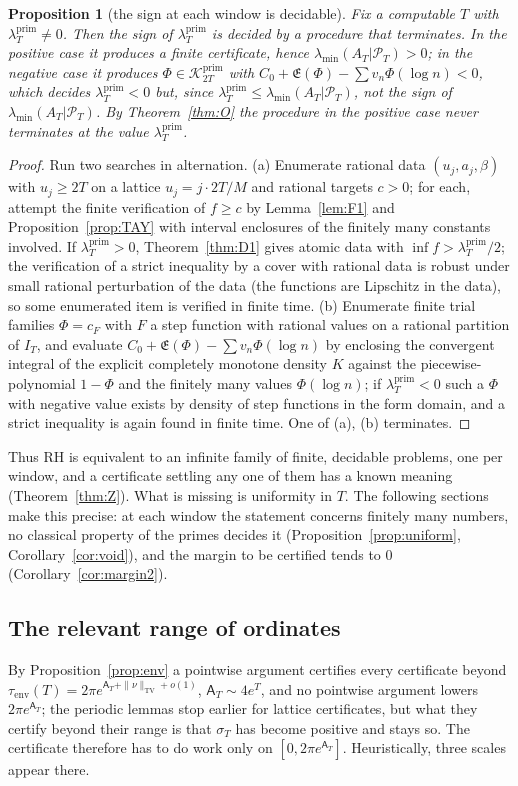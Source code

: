 \documentclass[11pt]{amsart}
\newtheorem{proposition}[theorem]{Proposition}
\theoremstyle{definition}
\theoremstyle{remark}
\newcommand{\TV}{\operatorname{TV}}
\newcommand{\Kp}{\mathcal K^{\mathrm{prim}}_{2T}}
\newcommand{\PT}{\mathcal P_T}
\newcommand{\IT}{I_T}
\newcommand{\lamP}{\lambda^{\mathrm{prim}}_T}
\newcommand{\lamA}{\lambda_{\min}(A_T|\PT)}
\newcommand{\sT}{\sigma_T}
\newcommand{\Lev}{\mathfrak E}
\newcommand{\Aconst}{\mathsf A_T}
\begin{document}
\begin{proposition}[the sign at each window is decidable]\label{prop:decide}
Fix a computable $T$ with $\lamP\ne0$. Then the sign of $\lamP$ is decided by a procedure that
terminates. In the positive case it produces a finite certificate, hence $\lamA>0$; in the negative
case it produces $\Phi\in\Kp$ with $C_0+\Lev(\Phi)-\sum v_n\Phi(\log n)<0$, which decides $\lamP<0$
but, since $\lamP\le\lamA$, not the sign of $\lamA$. By Theorem~\ref{thm:O} the procedure in the
positive case never terminates \emph{at} the value $\lamP$.
\end{proposition}
\begin{proof}
Run two searches in alternation. (a) Enumerate rational data $(u_j,a_j,\beta)$ with $u_j\ge2T$ on a
lattice $u_j=j\cdot2T/M$ and rational targets $c>0$; for each, attempt the finite verification of
$f\ge c$ by Lemma~\ref{lem:F1} and Proposition~\ref{prop:TAY} with interval enclosures of the finitely
many constants involved. If $\lamP>0$, Theorem~\ref{thm:D1} gives atomic data with
$\inf f>\lamP/2$; the verification of a strict inequality by a cover with rational data is
robust under small rational perturbation of the data (the functions are Lipschitz in the data),
so some enumerated item is verified in finite time. (b) Enumerate finite trial families
$\Phi=c_F$ with $F$ a step function with rational values on a rational partition of $\IT$, and
evaluate $C_0+\Lev(\Phi)-\sum v_n\Phi(\log n)$ by enclosing the convergent integral of the
explicit completely monotone density $K$ against the piecewise-polynomial $1-\Phi$ and the finitely
many values $\Phi(\log n)$; if $\lamP<0$ such a $\Phi$ with negative value exists by density of step
functions in the form domain, and a strict inequality is again found in finite time. One of (a),
(b) terminates.
\end{proof}

Thus RH is equivalent to an infinite family of finite, decidable problems, one per window, and a
certificate settling any one of them has a known meaning (Theorem~\ref{thm:Z}). What is missing is
uniformity in $T$. The following sections make this precise: at each window the statement concerns
finitely many numbers, no classical property of the primes decides it
(Proposition~\ref{prop:uniform}, Corollary~\ref{cor:void}), and the margin to be certified tends to $0$
(Corollary~\ref{cor:margin2}).

\subsection{The relevant range of ordinates}\label{subsec:where}
By Proposition~\ref{prop:env} a pointwise argument certifies every certificate beyond
$\tau_{\mathrm{env}}(T)=2\pi e^{\Aconst+\|\nu\|_{\TV}+o(1)}$, $\Aconst\sim4e^T$, and no pointwise
argument lowers $2\pi e^{\Aconst}$; the periodic lemmas stop earlier for lattice certificates, but
what they certify beyond their range is that $\sT$ has become positive and stays so. The certificate
therefore has to do work only on $[0,2\pi e^{\Aconst}]$. Heuristically, three scales appear there.
\end{document}
